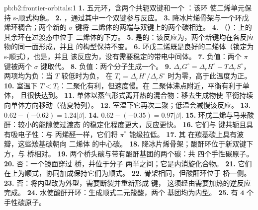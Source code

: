 \begin{solution}{pb:b2:frontier-orbitals:1}
\textbf{1.} 五元环，含两个共轭双键和一个 ：该环
使二烯单元保持 s-顺式构象。
\textbf{2.} ，通过其中一个双键参与反应。
\textbf{3.} 降冰片烯骨架与一个环戊烯环稠合；两个新的 $\sigma$ 键将
二烯体的两端与双键上的两个碳相连。
\textbf{4.} （）：上的其余环在过渡态中位于
二烯体的下方。
\textbf{5.} 是的：该反应为，两个新键均在各反应物的同一面形成，并且
的构型保持不变。
\textbf{6.} 环戊二烯既是良好的二烯体（锁定为 s-顺式），也是，并且
该反应为，没有需要稳定的带电中间体。
\textbf{7.} 负值：两个 $\pi$ 键被两个 $\sigma$ 键取代。
\textbf{8.} 负值：两个分子生成一个。
\textbf{9.} $\Delta_r G^\circ = \Delta_r H^\circ - T\Delta_r S^\circ$，两项均为负：当 $T$ 较低时为负，
在 $T_i = \Delta_r H^\circ/\Delta_r S^\circ$ 时为零，高于此温度为正。
\textbf{10.} 室温下 $T < T_i$：二聚化有利，但速度慢。在
二聚体沸点附近，平衡有利于单体，
且很快达到。
\textbf{11.} 单体以蒸气形式离开热的混合物：移去生成物使
平衡持续向单体方向移动（勒夏特列）。
\textbf{12.} 室温下它再次二聚；低温会减慢该反应。
\textbf{13.} $0.62 - (-0.62) = 1.24|\beta|$.
\textbf{14.} $0.62 - (-0.35) = 0.97|\beta|$.
\textbf{15.} 环戊二烯与马来酸酐：较小的能隙使过渡态
的稳定化程度更大，反应更快。
\textbf{16.} 它们与  键共轭且具有吸电子性：与
丙烯醛一样，它们将 $\pi^*$ 能级拉低。
\textbf{17.} 其  在羰基碳上具有波瓣，这些羰基碳朝向
二烯体  的中心碳。
\textbf{18.} 降冰片烯骨架；酸酐环位于新双键下方，与
 桥相对。
\textbf{19.} 两个桥头碳与带有酸酐基团的两个碳：共
四个手性碳原子。
\textbf{20.} 否：一个镜面穿过  桥，并位于分子
两半之间；它是内消旋化合物。
\textbf{21.} 它们在上为顺式，协同加成保持它们为顺式。
\textbf{22.} 骨架相同，但酸酐环位于  桥一侧。
\textbf{23.} 否：将内型改为外型，需要断裂并重新形成  键，
这须经由需要加热的逆反应完成。
\textbf{24.} 水使酸酐开环：生成顺式二元羧酸，两个  基团均为内型。
\textbf{25.} 有 $\boldsymbol{4}$ 个手性碳原子。
\end{solution}
